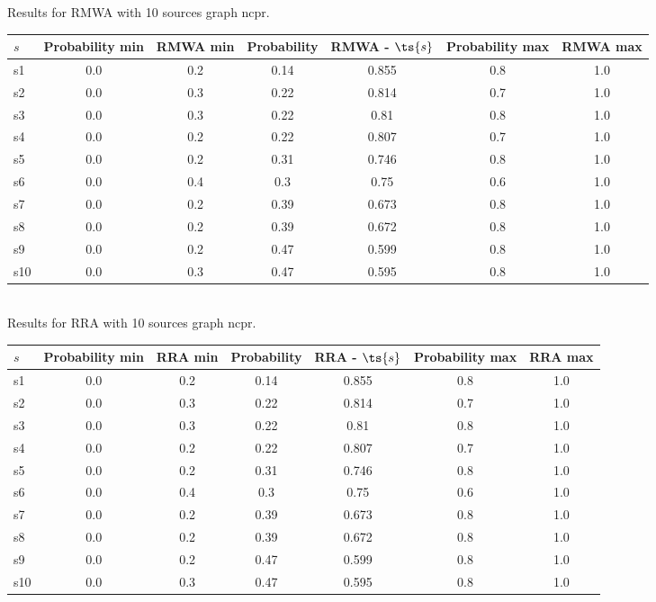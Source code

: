 \documentclass{article}
\begin{document}
\noindent Results for RMWA with 10 sources graph ncpr.

\noindent\begin{tabular}{|l|c|c|c|c|c|c|}
\hline
$s$& Probability min & RMWA min & Probability & RMWA - $\ts{s}$ & Probability max & RMWA max\\
\hline
s1 &0.0 & 0.2 & 0.14 & 0.855 & 0.8 & 1.0\\
\hline
s2 &0.0 & 0.3 & 0.22 & 0.814 & 0.7 & 1.0\\
\hline
s3 &0.0 & 0.3 & 0.22 & 0.81 & 0.8 & 1.0\\
\hline
s4 &0.0 & 0.2 & 0.22 & 0.807 & 0.7 & 1.0\\
\hline
s5 &0.0 & 0.2 & 0.31 & 0.746 & 0.8 & 1.0\\
\hline
s6 &0.0 & 0.4 & 0.3 & 0.75 & 0.6 & 1.0\\
\hline
s7 &0.0 & 0.2 & 0.39 & 0.673 & 0.8 & 1.0\\
\hline
s8 &0.0 & 0.2 & 0.39 & 0.672 & 0.8 & 1.0\\
\hline
s9 &0.0 & 0.2 & 0.47 & 0.599 & 0.8 & 1.0\\
\hline
s10 &0.0 & 0.3 & 0.47 & 0.595 & 0.8 & 1.0\\
\hline
\end{tabular}\\

\noindent Results for RRA with 10 sources graph ncpr.

\noindent\begin{tabular}{|l|c|c|c|c|c|c|}
\hline
$s$& Probability min & RRA min & Probability & RRA - $\ts{s}$ & Probability max & RRA max\\
\hline
s1 &0.0 & 0.2 & 0.14 & 0.855 & 0.8 & 1.0\\
\hline
s2 &0.0 & 0.3 & 0.22 & 0.814 & 0.7 & 1.0\\
\hline
s3 &0.0 & 0.3 & 0.22 & 0.81 & 0.8 & 1.0\\
\hline
s4 &0.0 & 0.2 & 0.22 & 0.807 & 0.7 & 1.0\\
\hline
s5 &0.0 & 0.2 & 0.31 & 0.746 & 0.8 & 1.0\\
\hline
s6 &0.0 & 0.4 & 0.3 & 0.75 & 0.6 & 1.0\\
\hline
s7 &0.0 & 0.2 & 0.39 & 0.673 & 0.8 & 1.0\\
\hline
s8 &0.0 & 0.2 & 0.39 & 0.672 & 0.8 & 1.0\\
\hline
s9 &0.0 & 0.2 & 0.47 & 0.599 & 0.8 & 1.0\\
\hline
s10 &0.0 & 0.3 & 0.47 & 0.595 & 0.8 & 1.0\\
\hline
\end{tabular}\\
\end{document}
